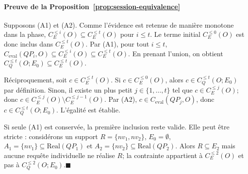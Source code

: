 \paragraph*{Preuve de la Proposition~\ref{prop:session-equivalence}}
Supposons (A1) et (A2). Comme l'évidence est retenue de manière monotone dans la phase, $C_E^{\le i}(O)\subseteq C_E^{\le t}(O)$ pour $i\le t$. Le terme initial $C_E^{\le0}(O)$ est donc inclus dans $C_E^{\le t}(O)$. Par (A1), pour tout $i\le t$, $C_{\mathrm{eval}}(QP_i,O)\subseteq C_E^{\le i}(O)\subseteq C_E^{\le t}(O)$. En prenant l'union, on obtient $C_Q^{\le t}(O;E_0)\subseteq C_E^{\le t}(O)$.

Réciproquement, soit $c\in C_E^{\le t}(O)$. Si $c\in C_E^{\le0}(O)$, alors $c\in C_Q^{\le t}(O;E_0)$ par définition. Sinon, il existe un plus petit $j\in\{1,\ldots,t\}$ tel que $c\in C_E^{\le j}(O)$; donc $c\in C_E^{\le j}(O)\setminus C_E^{\le j-1}(O)$. Par (A2), $c\in C_{\mathrm{eval}}(QP_j,O)$, donc $c\in C_Q^{\le t}(O;E_0)$. L'égalité est établie.

Si seule (A1) est conservée, la première inclusion reste valide. Elle peut être stricte : considérons un support $R=\{nv_1,nv_2\}$, $E_0=\emptyset$, $A_1=\{nv_1\}\subseteq\mathrm{Real}(QP_1)$ et $A_2=\{nv_2\}\subseteq\mathrm{Real}(QP_2)$. Alors $R\subseteq E_2$ mais aucune requête individuelle ne réalise $R$; la contrainte appartient à $C_E^{\le2}(O)$ et pas à $C_Q^{\le2}(O;E_0)$.\unskip\nobreak\hspace{0.5em}$\blacksquare$
